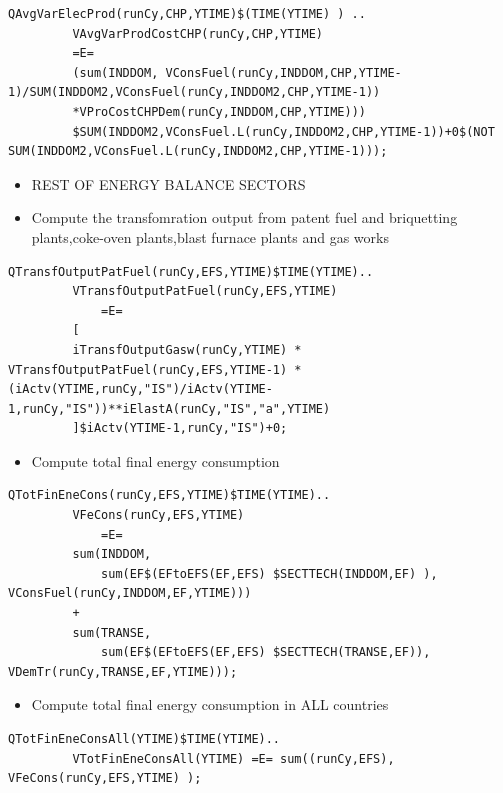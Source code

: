 \documentclass[a4paper,]{scrartcl}
\providecommand{\tightlist}{%
  \setlength{\itemsep}{0pt}\setlength{\parskip}{0pt}}
\begin{document}
\begin{lstlisting}
QAvgVarElecProd(runCy,CHP,YTIME)$(TIME(YTIME) ) ..
         VAvgVarProdCostCHP(runCy,CHP,YTIME)
         =E=
         (sum(INDDOM, VConsFuel(runCy,INDDOM,CHP,YTIME-1)/SUM(INDDOM2,VConsFuel(runCy,INDDOM2,CHP,YTIME-1))
         *VProCostCHPDem(runCy,INDDOM,CHP,YTIME)))
         $SUM(INDDOM2,VConsFuel.L(runCy,INDDOM2,CHP,YTIME-1))+0$(NOT SUM(INDDOM2,VConsFuel.L(runCy,INDDOM2,CHP,YTIME-1)));
\end{lstlisting}

\begin{itemize}
\tightlist
\item
  REST OF ENERGY BALANCE SECTORS
\item
  Compute the transfomration output from patent fuel and briquetting
  plants,coke-oven plants,blast furnace plants and gas works
\end{itemize}

\begin{lstlisting}
QTransfOutputPatFuel(runCy,EFS,YTIME)$TIME(YTIME)..
         VTransfOutputPatFuel(runCy,EFS,YTIME)
             =E=
         [
         iTransfOutputGasw(runCy,YTIME) * VTransfOutputPatFuel(runCy,EFS,YTIME-1) * (iActv(YTIME,runCy,"IS")/iActv(YTIME-1,runCy,"IS"))**iElastA(runCy,"IS","a",YTIME)
         ]$iActv(YTIME-1,runCy,"IS")+0;
\end{lstlisting}

\begin{itemize}
\tightlist
\item
  Compute total final energy consumption
\end{itemize}

\begin{lstlisting}
QTotFinEneCons(runCy,EFS,YTIME)$TIME(YTIME)..
         VFeCons(runCy,EFS,YTIME)
             =E=
         sum(INDDOM,
             sum(EF$(EFtoEFS(EF,EFS) $SECTTECH(INDDOM,EF) ), VConsFuel(runCy,INDDOM,EF,YTIME)))
         +
         sum(TRANSE,
             sum(EF$(EFtoEFS(EF,EFS) $SECTTECH(TRANSE,EF)), VDemTr(runCy,TRANSE,EF,YTIME)));
\end{lstlisting}

\begin{itemize}
\tightlist
\item
  Compute total final energy consumption in ALL countries
\end{itemize}

\begin{lstlisting}
QTotFinEneConsAll(YTIME)$TIME(YTIME)..
         VTotFinEneConsAll(YTIME) =E= sum((runCy,EFS), VFeCons(runCy,EFS,YTIME) );     
\end{lstlisting}
\end{document}
